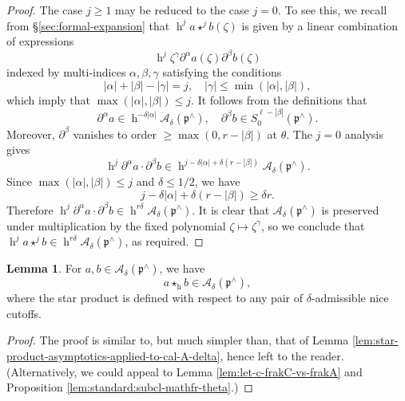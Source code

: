 \documentclass[reqno]{amsart}
\DeclareMathOperator{\h}{h}
\theoremstyle{plain} \newtheorem{theorem} {Theorem}
\theoremstyle{definition} \newtheorem{definition} [theorem] {Definition}
\theoremstyle{itplain} %
\newtheorem{lemma}[theorem]{Lemma}
\numberwithin{equation}{section}
\numberwithin{theorem}{section}
\renewcommand{\geq}{\geqslant}
\renewcommand{\leq}{\leqslant}
\begin{document}
\begin{proof}
  The case $j \geq 1$ may be reduced to the case $j=0$.  To see this, we recall from \S\ref{sec:formal-expansion} that $\h^j a \star^j b(\zeta)$ is given by a linear combination of expressions
  \begin{equation*}
    \h^j \zeta^\gamma \partial^\alpha a(\zeta) \partial^\beta b(\zeta)
  \end{equation*}
  indexed by multi-indices $\alpha, \beta, \gamma$ satisfying the conditions
  \begin{equation*}
    |\alpha| + |\beta| - |\gamma| = j,
    \quad
    |\gamma| \leq \min(|\alpha|,|\beta|),
  \end{equation*}
  which imply that $\max(|\alpha|,|\beta|) \leq j$.  It follows from the definitions that
  \begin{equation*}
    \partial^\alpha a \in \h^{- \delta |\alpha|} \mathcal{A}_{\delta}(\mathfrak{p}^\wedge), \quad
  \partial^{\beta} b \in S_0^{\ell-|\beta|}(\mathfrak{p}^\wedge).
\end{equation*}
  Moreover, $\partial^{\beta}$ vanishes to order $\geq \max(0,r - |\beta|)$ at $\theta$.  The $j = 0$ analysis gives
  \begin{equation*}
    \h^j \partial^\alpha a \cdot \partial^\beta b
    \in
    \h^{j - \delta |\alpha| + \delta ( r - |\beta|)} \mathcal{A}_{\delta}(\mathfrak{p}^\wedge).      
  \end{equation*}
  Since $\max(|\alpha|,|\beta|) \leq j$ and $\delta \leq 1/2$, we have
  \begin{equation*}
    j - \delta |\alpha| + \delta ( r - |\beta|)
    \geq \delta r.
  \end{equation*}
  Therefore $\h^j \partial^\alpha a \cdot \partial^\beta b \in \h^{r \delta } \mathcal{A}_\delta(\mathfrak{p}^\wedge)$.  It is clear that $\mathcal{A}_{\delta}(\mathfrak{p}^\wedge)$ is preserved under multiplication by the fixed polynomial $\zeta \mapsto \zeta^\gamma$, so we conclude that $\h^j a \star^j b \in \h^{r \delta} \mathcal{A}_{\delta}(\mathfrak{p}^\wedge)$, as required.
\end{proof}

\begin{lemma}\label{lem:star-product-asymptotics-applied-to-cal-A-delta-2}
  For $a,b \in \mathcal{A}_\delta(\mathfrak{p}^\wedge)$, we have
  \begin{equation*}
    a \star_{\h} b \in \mathcal{A}_\delta(\mathfrak{p}^\wedge),
  \end{equation*}
  where the star product is defined with respect to any pair of $\delta$-admissible nice cutoffs.
\end{lemma}
\begin{proof}
  The proof is similar to, but much simpler than, that of Lemma \ref{lem:star-product-asymptotics-applied-to-cal-A-delta}, hence left to the reader.  (Alternatively, we could appeal to Lemma \ref{lem:let-c-frakC-vs-frakA} and Proposition \ref{lem:standard:subcl-mathfr-theta}.)
\end{proof}
\end{document}
